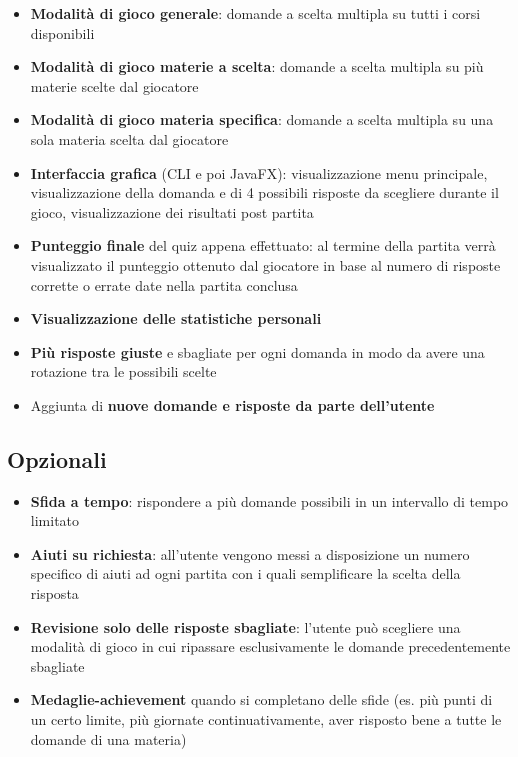         \begin{itemize}
            \item \textbf{Modalità di gioco generale}: domande a scelta multipla su tutti i corsi disponibili
            
            \item \textbf{Modalità di gioco materie a scelta}: domande a scelta multipla su più materie scelte dal giocatore
            
            \item \textbf{Modalità di gioco materia specifica}: domande a scelta multipla su una sola materia scelta dal giocatore
            
            \item \textbf{Interfaccia grafica} (CLI e poi JavaFX): visualizzazione menu principale, visualizzazione della domanda e di 4 possibili risposte da scegliere durante il gioco, visualizzazione dei risultati post partita
            
            \item \textbf{Punteggio finale} del quiz appena effettuato: al termine della partita verrà visualizzato il punteggio ottenuto dal giocatore in base al numero di risposte corrette o errate date nella partita conclusa
            
            \item \textbf{Visualizzazione delle statistiche personali}
            
            \item \textbf{Più risposte giuste} e sbagliate per ogni domanda in modo da avere una rotazione tra le possibili scelte
            
            \item Aggiunta di \textbf{nuove domande e risposte da parte dell’utente}
        \end{itemize}  

    
        \subsection{Opzionali}
        \begin{itemize}
            \item \textbf{Sfida a tempo}: rispondere a più domande possibili in un intervallo di tempo limitato
            \item \textbf{Aiuti su richiesta}: all’utente vengono messi a disposizione un numero specifico di aiuti ad ogni partita con i quali semplificare la scelta della risposta
            \item \textbf{Revisione solo delle risposte sbagliate}: l’utente può scegliere una modalità di gioco in cui ripassare esclusivamente le domande precedentemente sbagliate
            \item \textbf{Medaglie-achievement} quando si completano delle sfide (es. più punti di un certo limite, più giornate continuativamente, aver risposto bene a tutte le domande di una materia)
        \end{itemize}

